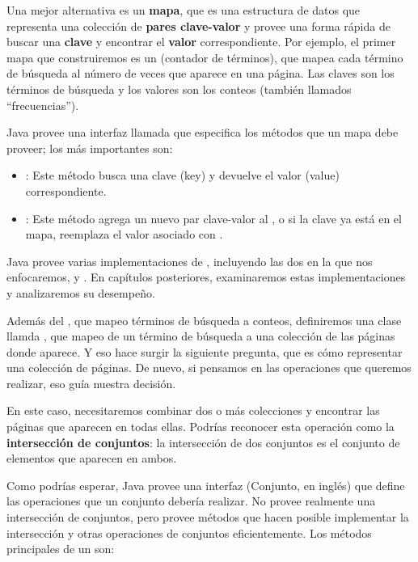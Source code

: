\documentclass[12pt]{book}
\theoremstyle{exercise}
\begin{document}

Una mejor alternativa es un \textbf{mapa}, que es una estructura de datos que
representa una colección de \textbf{pares clave-valor} y provee una forma
rápida de buscar una \textbf{clave} y encontrar el \textbf{valor} correspondiente.
Por ejemplo, el primer mapa que construiremos es un  (contador
de términos), que mapea cada término de búsqueda al número de veces que aparece
en una página. Las claves son los términos de búsqueda y los valores son los
conteos (también llamados ``frecuencias'').

Java provee una interfaz llamada  que especifica los métodos
que un mapa debe proveer; los más importantes son:

\begin{itemize}

\item
  : Este método busca una clave (key) y devuelve el
  valor (value) correspondiente.

\item
  : Este método agrega un nuevo par clave-valor al
  , o si la clave ya está en el mapa, reemplaza el valor asociado con .

\end{itemize}

Java provee varias implementaciones de , incluyendo las dos en
la que nos enfocaremos,  y . En capítulos
posteriores, examinaremos estas implementaciones y analizaremos su desempeño.

Además del , que mapeo términos de búsqueda a conteos,
definiremos una clase llamda , que mapeo de un término de
búsqueda a una colección de las páginas donde aparece. Y eso hace surgir
la siguiente pregunta, que es cómo representar una colección de páginas.
De nuevo, si pensamos en las operaciones que queremos realizar, eso guía
nuestra decisión.


En este caso, necesitaremos combinar dos o más colecciones y encontrar las
páginas que aparecen en todas ellas. Podrías reconocer esta operación como
la \textbf{intersección de conjuntos}: la intersección de dos conjuntos es el
conjunto de elementos que aparecen en ambos.

Como podrías esperar, Java provee una interfaz  (Conjunto, en inglés) que
define las operaciones que un conjunto debería realizar. No provee realmente una
intersección de conjuntos, pero provee métodos que hacen posible implementar la
intersección y otras operaciones de conjuntos eficientemente. Los métodos
principales de un  son:
\end{document}
